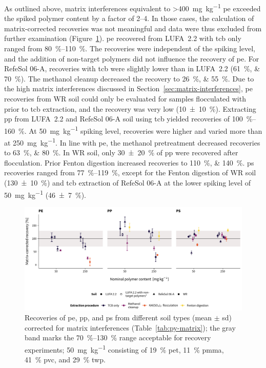 As outlined above, matrix interferences equivalent to \SI{>400}{\milli\gram\per\kilo\gram} \ac{pe} exceeded the spiked polymer content by a factor of \numrange{2}{4}. In those cases, the calculation of matrix-corrected recoveries was not meaningful and data were thus excluded from further examination (Figure~\ref{fig:py-recovery}).
\Ac{pe} recovered from LUFA~2.2 with \ac{tcb} only ranged from \SIrange[range-phrase = { to }]{80}{110}{\percent}. The recoveries were independent of the spiking level, and the addition of non-target polymers did not influence the recovery of \ac{pe}. For RefeSol 06-A, recoveries with \ac{tcb} were slightly lower than in LUFA~2.2 (\SIlist{61;70}{\percent}). The methanol cleanup decreased the recovery to \SIlist{26;55}{\percent}. Due to the high matrix interferences discussed in Section~\ref{sec:matrix-interferences}, \ac{pe} recoveries from WR soil could only be evaluated for samples flocculated with  prior to \ac{tcb} extraction, and the recovery was very low (\SI{10(10)}{\percent}).
Extracting \ac{pp} from LUFA~2.2 and RefeSol 06-A soil using \ac{tcb} yielded recoveries of \SIrange{100}{160}{\percent}. At \SI{50}{\milli\gram\per\kilo\gram} spiking level, recoveries were higher and varied more than at \SI{250}{\milli\gram\per\kilo\gram}. In line with \ac{pe}, the methanol pretreatment decreased recoveries to \SIlist{63;80}{\percent}. In WR soil, only \SI{30(20)}{\percent} of \ac{pp} were recovered after  flocculation. Prior Fenton digestion increased recoveries to \SIlist{110;140}{\percent}.
\Ac{ps} recoveries ranged from \SIrange[range-phrase = { to }]{77}{119}{\percent}, except for the Fenton digestion of WR soil (\SI{130(10)}{\percent}) and \ac{tcb} extraction of RefeSol 06-A at the lower spiking level of \SI{50}{\milli\gram\per\kilo\gram} (\SI{46(7)}{\percent}).

\begin{figure}[t]
	\centering
	\includegraphics[width=\textwidth]{figures/py-recovery}
	\caption[Recoveries of \ac{pe}, \ac{pp}, and \ac{ps} from different soil types corrected for matrix interferences.]{Recoveries of \ac{pe}, \ac{pp}, and \ac{ps} from different soil types (mean $\pm$ \ac{sd}) corrected for matrix interferences (Table~\protect\ref{tab:py-matrix}); the gray band marks the \SIrange{70}{130}{\percent} range acceptable for recovery experiments; \textsuperscript{\textasteriskcentered} \SI{50}{\milli\gram\per\kilo\gram} consisting of \SI{19}{\percent} \ac{pet}, \SI{11}{\percent} \ac{pmma}, \SI{41}{\percent} \ac{pvc}, and \SI{29}{\percent} \ac{twp}.}
	\label{fig:py-recovery}
\end{figure}

